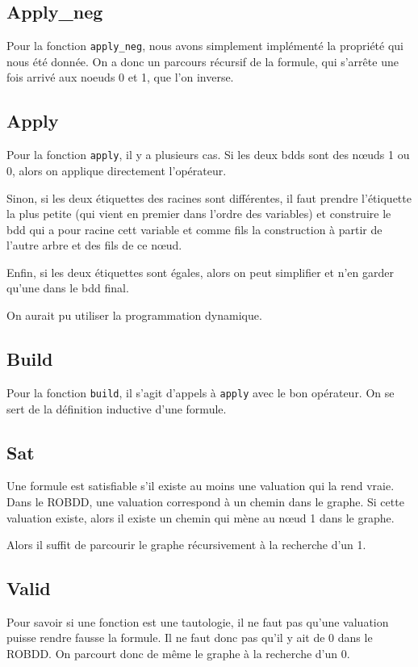 \documentclass[12pt]{article}
\def\code#1{\texttt{#1}}
\begin{document}
\subsection*{Apply\_neg}
Pour la fonction \code{apply\_neg}, nous avons simplement implémenté la propriété qui nous été donnée. On a donc un parcours récursif de la formule, qui s'arrête une fois arrivé aux noeuds 0 et 1, que l'on inverse.

\subsection*{Apply}
Pour la fonction \code{apply}, il y a plusieurs cas.
Si les deux bdds sont des n\oe uds 1 ou 0, alors on applique directement l'opérateur.

Sinon, si les deux étiquettes des racines sont différentes, il faut prendre l'étiquette la plus petite (qui vient en premier dans l'ordre des variables) et construire le bdd qui a pour racine cett variable et comme fils la construction à partir de l'autre arbre et des fils de ce n\oe ud.

Enfin, si les deux étiquettes sont égales, alors on peut simplifier et n'en garder qu'une dans le bdd final.


On aurait pu utiliser la programmation dynamique.

\subsection*{Build}
Pour la fonction \code{build}, il s'agit d'appels à \code{apply} avec le bon opérateur. On se sert de la définition inductive d'une formule.

\subsection*{Sat}
Une formule est satisfiable s'il existe au moins une valuation qui la rend vraie. Dans le ROBDD, une valuation correspond à un chemin dans le graphe. Si cette valuation existe, alors il existe un chemin qui mène au n\oe ud 1 dans le graphe.

Alors il suffit de parcourir le graphe récursivement à la recherche d'un 1.

\subsection*{Valid}
Pour savoir si une fonction est une tautologie, il ne faut pas qu'une valuation puisse rendre fausse la formule. Il ne faut donc pas qu'il y ait de 0 dans le ROBDD. On parcourt donc de même le graphe à la recherche d'un 0.
\end{document}
